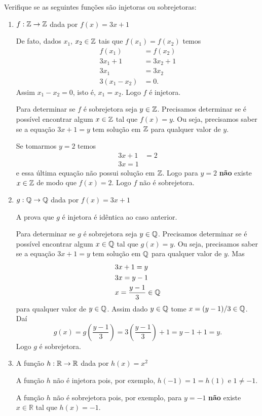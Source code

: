 \begin{exemplos}
	Verifique se as seguintes funções são injetoras ou sobrejetoras:
	\begin{enumerate}[label={\arabic*})]
		\item $f : \mathbb{Z} \to \mathbb{Z}$ dada por $f(x) = 3x + 1$
		\begin{solucao}
			De fato, dados $x_1$, $x_2 \in \mathbb{Z}$ tais que $f(x_1) = f(x_2)$ temos
			\begin{align*}
				f(x_1) &= f(x_2)\\
				3x_1 + 1 &= 3x_2 + 1\\
				3x_1 &= 3x_2\\
				3(x_1 - x_2) &= 0.
			\end{align*}
			Assim $x_1 - x_2 = 0$, isto é, $x_1 = x_2$. Logo $f$ é injetora.

			Para determinar se $f$ é sobrejetora seja $y \in \mathbb{Z}$. Precisamos determinar se é possível encontrar algum $x \in \mathbb{Z}$ tal que $f(x) = y$. Ou seja, precisamos saber se a equação $3x + 1 = y$ tem solução em $\mathbb{Z}$ para qualquer valor de $y$.

			Se tomarmos $y = 2$ temos
			\begin{align*}
				3x + 1 &= 2\\
				3x = 1
			\end{align*}
			e essa última equação não possui solução em $\mathbb{Z}$. Logo para $y = 2$ \textbf{não} existe $x \in \mathbb{Z}$ de modo que $f(x) = 2$. Logo $f$ não é sobrejetora.
		\end{solucao}

		\item $g : \mathbb{Q} \to \mathbb{Q}$ dada por $f(x) = 3x + 1$
		\begin{solucao}
			A prova que $g$ é injetora é idêntica ao caso anterior.

			Para determinar se $g$ é sobrejetora seja $y \in \mathbb{Q}$. Precisamos determinar se é possível encontrar algum $x \in \mathbb{Q}$ tal que $g(x) = y$. Ou seja, precisamos saber se a equação $3x + 1 = y$ tem solução em $\mathbb{Q}$ para qualquer valor de $y$. Mas
			\begin{align*}
				&3x + 1 = y\\
				&3x = y - 1\\
				&x = \dfrac{y - 1}{3} \in \mathbb{Q}
			\end{align*}
			para qualquer valor de $y \in \mathbb{Q}$. Assim dado $y \in \mathbb{Q}$ tome $x = (y - 1)/3 \in \mathbb{Q}$. Daí
			\[
				g(x) = g\left(\dfrac{y - 1}{3}\right) = 3\left(\dfrac{y - 1}{3}\right) + 1 = y - 1 + 1 = y. 
			\]
			Logo $g$ é sobrejetora.
		\end{solucao}
		
		\item A função $h :\mathbb{R} \to \mathbb{R}$ dada por $h(x) = x^2$
		\begin{solucao}
			A função $h$ não é injetora pois, por exemplo, $h(-1) = 1 = h(1)$ e $1\neq -1$.

			A função $h$ não é sobrejetora pois, por exemplo, para $y = -1$ \textbf{não} existe $x\in\mathbb{R}$ tal que $h(x) = -1$.
		\end{solucao}
		\end{enumerate}
\end{exemplos}

